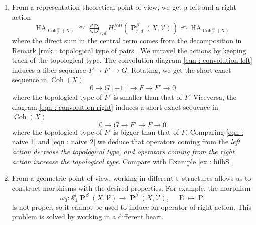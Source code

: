 \documentclass[11pt]{article}
\newcommand{\segal}{\mathcal{S}}
\newcommand{\coh}{\operatorname{Coh}}
\newcommand{\cohbetass}{\operatorname{Coh}^{ss}_{\beta}(X)}
\newcommand{\framing}{\mathcal{V}}
\newcommand{\pairs}{\boldsymbol{\operatorname{P}}^{\beta}(X,\mathcal{V})}
\begin{document}
 \begin{enumerate}
     \item From a representation theoretical point of view, we get a left and a right action 
     \[
       \operatorname{HA}_{\cohbetass} \curvearrowright \bigoplus_{r,d}H^{BM}_*(\boldsymbol{\operatorname{P}}^\beta_{r,d}(X,\framing)) \curvearrowleft \operatorname{HA}_{\cohbetass}  
     \]
     where the direct sum in the central term comes from the decomposition in Remark \ref{rmk : topological type of pairs}. We unravel the actions by keeping track of the topological type. The convolution diagram \eqref{eqn : convolution left} induces a fiber sequence $F\rightarrow F'\rightarrow G$. Rotating, we get the short exact sequence in $\coh(X)$
     \begin{equation}\label{eqn : naive 1}
           0 \rightarrow G[-1] \rightarrow F \rightarrow F' \rightarrow 0
     \end{equation}
     where the topological type of $F'$ is smaller than that of $F$. Viceversa, the diagram \eqref{eqn : convolution right} induces a short exact sequence in $\coh(X)$
     \begin{equation}\label{eqn : naive 2}
         0 \rightarrow G \rightarrow F' \rightarrow F \rightarrow 0
     \end{equation}
      where the topological type of $F'$ is bigger than that of $F$. Comparing \eqref{eqn : naive 1} and \eqref{eqn : naive 2} we deduce that operators coming from the \textit{left action decrease the topological type, and operators coming from the right action increase the topological type}. Compare with Example \ref{ex : hilbS}.

      \item\label{itm : coh ss topo prop} From a geometric point of view, working in different t--structures allows us to construct morphisms with the desired properties. For example, the morphism
      \[
       \omega_0 \colon  \segal_1^l\pairs \longrightarrow \pairs, \quad \operatorname{E} \longmapsto \operatorname{P}
      \]
      is not proper, so it cannot be used to induce an operator of right action. This problem is solved by working in a different heart.
 \end{enumerate}
\end{document}
